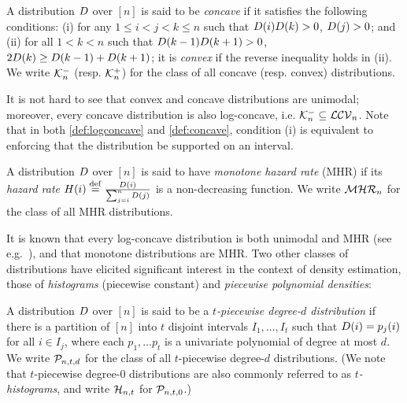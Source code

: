 \begin{definition}\label{def:concave}
  A distribution $\D$ over $[n]$ is said to be \emph{concave} if it satisfies the following conditions: \textsf{(i)} for any $1 \leq i < j < k \leq n$ such that $\D(i)\D(k) > 0$, $\D(j) > 0$; and \textsf{(ii)} for all $1 < k < n$ such that $\D(k - 1)\D(k + 1)>0$, $2\D(k) \geq \D(k - 1)+\D(k + 1)$; it is \emph{convex} if the reverse inequality holds in \textsf{(ii)}. We write $\classcve$ (resp. $\classcvx$) for the class of all concave (resp. convex) distributions.
\end{definition}
It is not hard to see that convex and concave distributions are unimodal; moreover, every concave distribution is also log-concave, i.e. $\classcve\subseteq\classlogconcave$. Note that in both \cref{def:logconcave} and \cref{def:concave}, condition \textsf{(i)} is equivalent to enforcing that the distribution be supported on an interval.

\begin{definition}\label{def:mhr}
  A distribution $\D$ over $[n]$ is said to have \emph{monotone hazard rate} (MHR) if its \emph{hazard rate} $H(i)\eqdef \frac{\D(i)}{\sum_{j=i}^{n} \D(j)}$ is a non-decreasing function. We write $\classmhr$ for the class of all MHR distributions.
\end{definition}
It is known that every log-concave distribution is both unimodal and MHR (see e.g.~\cite[Proposition 10]{An:96}), and that monotone distributions are MHR. Two other classes of distributions have elicited significant interest in the context of density estimation, those of \emph{histograms} (piecewise constant) and \emph{piecewise polynomial densities}:
\begin{definition}\label{def:piecewise}
  A distribution $\D$ over $[n]$ is said to be a \emph{$t$-piecewise degree-$d$ distribution} if there is a partition of $[n]$ into $t$ disjoint intervals $I_1,\dots,I_t$ such that $\D(i) = p_j(i)$ for all $i \in I_j$, where each $p_1,\dots p_t$ is a univariate polynomial of degree at most $d$. We write $\classpoly$ for the class of all $t$-piecewise degree-$d$ distributions. (We note that {$t$-piecewise degree-$0$ distributions} are also commonly referred to as \emph{$t$-histograms}, and write $\classhist$ for $\classpoly[t,0]$.)
\end{definition}


